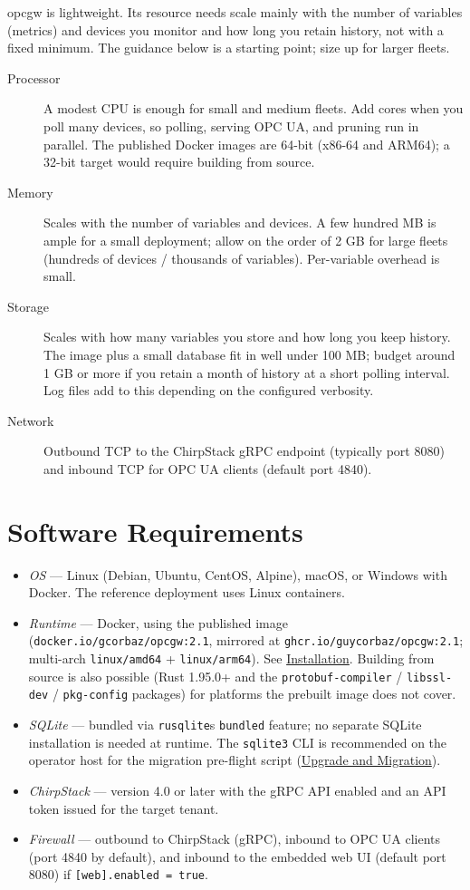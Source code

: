 opcgw is lightweight. Its resource needs scale mainly with the number of variables (metrics) and devices you monitor and how long you retain history, not with a fixed minimum. The guidance below is a starting point; size up for larger fleets.

\begin{description}
\item[Processor]
A modest CPU is enough for small and medium fleets. Add cores when you poll many devices, so polling, serving OPC UA, and pruning run in parallel. The published Docker images are 64-bit (x86-64 and ARM64); a 32-bit target would require building from source.
\item[Memory]
Scales with the number of variables and devices. A few hundred MB is ample for a small deployment; allow on the order of 2 GB for large fleets (hundreds of devices / thousands of variables). Per-variable overhead is small.
\item[Storage]
Scales with how many variables you store and how long you keep history. The image plus a small database fit in well under 100 MB; budget around 1 GB or more if you retain a month of history at a short polling interval. Log files add to this depending on the configured verbosity.
\item[Network]
Outbound TCP to the ChirpStack gRPC endpoint (typically port 8080) and inbound TCP for OPC UA clients (default port 4840).
\end{description}

\section{Software Requirements}\label{sec-software-requirements}

\begin{itemize}
\item
  \emph{OS} --- Linux (Debian, Ubuntu, CentOS, Alpine), macOS, or Windows with Docker. The reference deployment uses Linux containers.
\item
  \emph{Runtime} --- Docker, using the published image (\texttt{docker.io/gcorbaz/opcgw:2.1}, mirrored at \texttt{ghcr.io/guycorbaz/opcgw:2.1}; multi-arch \texttt{linux/amd64} + \texttt{linux/arm64}). See \hyperref[ch-installation]{Installation}. Building from source is also possible (Rust 1.95.0+ and the \texttt{protobuf-compiler} / \texttt{libssl-dev} / \texttt{pkg-config} packages) for platforms the prebuilt image does not cover.
\item
  \emph{SQLite} --- bundled via \texttt{rusqlite}\textquotesingle s \texttt{bundled} feature; no separate SQLite installation is needed at runtime. The \texttt{sqlite3} CLI is recommended on the operator host for the migration pre-flight script (\hyperref[ch-upgrade]{Upgrade and Migration}).
\item
  \emph{ChirpStack} --- version 4.0 or later with the gRPC API enabled and an API token issued for the target tenant.
\item
  \emph{Firewall} --- outbound to ChirpStack (gRPC), inbound to OPC UA clients (port 4840 by default), and inbound to the embedded web UI (default port 8080) if \texttt{{[}web{]}.enabled\ =\ true}.
\end{itemize}

